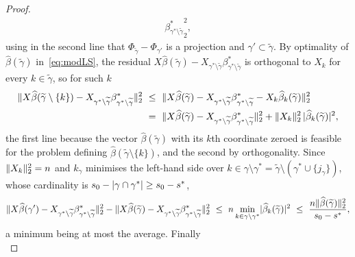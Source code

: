 \begin{proof}
\begin{align}
{            \beta^\ast_{\gamma^{\ast}\setminus\widetilde\gamma}}_2^{2},
    \end{align}
    using in the second line that
    $\Phi_{\widetilde\gamma}-\Phi_{\gamma'}$ is a projection and
    $\gamma'\subset\widetilde\gamma$. By optimality of
    $\widehat\beta(\widetilde\gamma)$ in~\eqref{eq:modLS}, the residual
    $X\widehat\beta(\widetilde\gamma)
    -X_{\gamma^{\ast}\setminus\widetilde\gamma}
    \beta^\ast_{\gamma^{\ast}\setminus\widetilde\gamma}$ is orthogonal to
    $X_k$ for every $k\in\widetilde\gamma$, so for such $k$
    \begin{align*}
        \lVert X\widehat\beta(\widetilde\gamma\setminus\{k\})
        -X_{\gamma^{\ast}\setminus\widetilde\gamma}
            \beta^\ast_{\gamma^{\ast}\setminus\widetilde\gamma}\rVert_2^{2}
        &\ \leq\ \lVert X\widehat\beta(\widetilde\gamma)
        -X_{\gamma^{\ast}\setminus\widetilde\gamma}
            \beta^\ast_{\gamma^{\ast}\setminus\widetilde\gamma}
            -X_k\widehat\beta_k(\widetilde\gamma)\rVert_2^{2}\\
        &\ =\ \lVert X\widehat\beta(\widetilde\gamma)
        -X_{\gamma^{\ast}\setminus\widetilde\gamma}
            \beta^\ast_{\gamma^{\ast}\setminus\widetilde\gamma}\rVert_2^{2}
        +\lVert X_k\rVert_2^{2}\,
        \lvert\widehat\beta_k(\widetilde\gamma)\rvert^{2},
    \end{align*}
    the first line because the vector $\widehat\beta(\widetilde\gamma)$
    with its $k$th coordinate zeroed is feasible for the problem defining
    $\widehat\beta(\widetilde\gamma\setminus\{k\})$, and the second by
    orthogonality. Since $\lVert X_k\rVert_2^{2}=n$ and $k_\gamma$ minimises the
    left-hand side over $k\in\gamma\setminus\gamma^\ast
    =\widetilde\gamma\setminus(\gamma^{\ast}\cup\{j_\gamma\})$, whose
    cardinality is $s_0-\lvert\gamma\cap\gamma^{\ast}\rvert\geq s_0-s^{\ast}$,
    \begin{equation*}
        \lVert X\widehat\beta(\gamma')
        -X_{\gamma^{\ast}\setminus\widetilde\gamma}
            \beta^\ast_{\gamma^{\ast}\setminus\widetilde\gamma}\rVert_2^{2}
        -\lVert X\widehat\beta(\widetilde\gamma)
        -X_{\gamma^{\ast}\setminus\widetilde\gamma}
            \beta^\ast_{\gamma^{\ast}\setminus\widetilde\gamma}\rVert_2^{2}
        \ \leq\ n\min_{k\in\gamma\setminus\gamma^\ast}
        \lvert\widehat\beta_k(\widetilde\gamma)\rvert^{2}
        \ \leq\ \frac{n\lVert\widehat\beta(\widetilde\gamma)\rVert_2^{2}}
        {s_0-s^{\ast}},
    \end{equation*}
    a minimum being at most the average. Finally
    \begin{equation*}

\end{equation*}
\end{proof}
